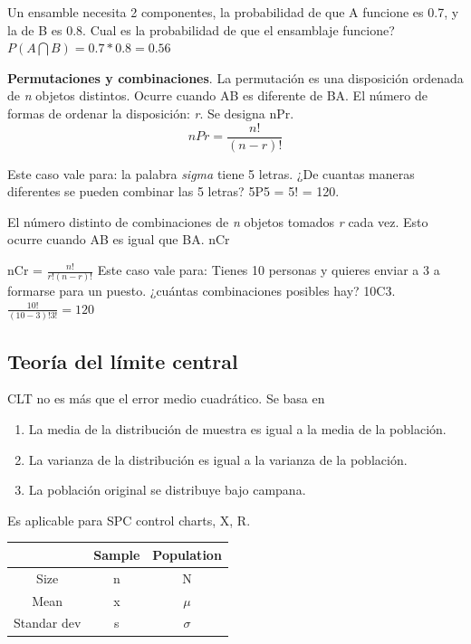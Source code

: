 \documentclass[]{article}
\begin{document}
Un ensamble necesita 2 componentes, la probabilidad de que A funcione es 0.7, y la de B es 0.8. Cual es la probabilidad de que el ensamblaje funcione? $P(A \bigcap B) = 0.7*0.8 = 0.56$

\textbf{Permutaciones y combinaciones}. \newline La permutación es una disposición ordenada de \textit{n} objetos distintos. Ocurre cuando AB es diferente de BA. El número de formas de ordenar la disposición: \textit{r}. Se designa nPr.
\begin{equation}
nPr = \frac{n!}{(n-r)!}
\end{equation}

Este caso vale para: la palabra \textit{sigma} tiene 5 letras. ¿De cuantas maneras diferentes se pueden combinar las 5 letras? 5P5 = 5! = 120.

El número distinto de combinaciones de \textit{n} objetos tomados \textit{r} cada vez. Esto ocurre cuando AB es igual que BA. nCr

nCr = $\frac{n!}{r!(n-r)!}$
Este caso vale para: Tienes 10 personas y quieres enviar a 3 a formarse para un puesto. ¿cuántas combinaciones posibles hay? 10C3. $\frac{10!}{(10-3)!3!} = 120$

\subsection{Teoría del límite central}

CLT no es más que el error medio cuadrático. Se basa en

\begin{enumerate}
	\item La media de la distribución de muestra es igual a la media de la población.
	\item La varianza de la distribución es igual a la varianza de la población.
	\item La población original se distribuye bajo campana.
\end{enumerate}

Es aplicable para SPC control charts, X, R.

\begin{tabular}{|c|c|c|}
	\hline  & Sample & Population \\ 
	\hline Size & n & N \\ 
	\hline Mean & x & $\mu$ \\ 
	\hline Standar dev & s & $\sigma$ \\ 
	\hline 
\end{tabular} 
\end{document}
